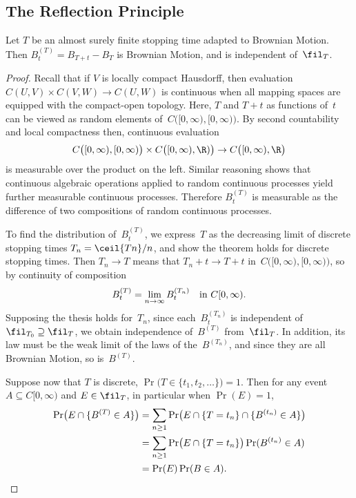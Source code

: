 \subsection	{The Reflection Principle}

\begin	{theorem}
Let $T$ be an almost surely finite stopping time adapted to Brownian Motion.
Then \( B^{(T)}_t = B_{T+t} - B_T \) is Brownian Motion,
and is independent of~$\fil_T$.
\end	{theorem}
\begin	{proof}
Recall that if $V$ is locally compact Hausdorff,
then evaluation \( C(U,V) \times C(V,W) \to C(U,W) \) is continuous
when all mapping spaces are equipped with the compact-open topology.
Here, $T$ and \( T + t \) as functions of~$t$
can be viewed as random elements of~$C\bigl([0,\infty),[0,\infty)\bigr)$.
By second countability and local compactness then,
continuous evaluation \[
	C\bigl([0,\infty),[0,\infty)\bigr) \times
		C\bigl([0,\infty),\R)\bigr)
	\to C\bigl([0,\infty),\R\bigr)
\] is measurable over the product on the left.
Similar reasoning shows that continuous algebraic operations
applied to random continuous processes
yield further measurable continuous processes.
Therefore $B^{(T)}_t$ is measurable as the difference
of two compositions of random continuous processes.

To find the distribution of~$B^{(T)}_t$,
we express~$T$ as the decreasing limit of discrete stopping times
\( T_n = \ceil{Tn}/n \),
and show the theorem holds for discrete stopping times.
Then \( T_n \to T \) means that \( T_n + t \to T + t \)
in~$C\bigl([0,\infty),[0,\infty)\bigr)$,
so by continuity of composition \[
	B^{(T)}_t = \lim_{n\to\infty} B^{(T_n)}_t
	\quad \text{in~\( C[0,\infty) \).}
\]
Supposing the thesis holds for~$T_n$,
since each~$B^{(T_n)}_t$ is independent of~\( \fil_{T_0} \supseteq \fil_T \),
we obtain independence of~$B^{(T)}$ from~$\fil_T$.
In addition, its law must be the weak limit of the laws of the~$B^{(T_n)}$,
and since they are all Brownian Motion, so is~$B^{(T)}$.

Suppose now that $T$ is discrete,
\( \Pr\bigl(T\in\{t_1,t_2,\dotsc\}\bigr) = 1 \).
Then for any event \( A \subseteq C[0,\infty) \) and \( E \in \fil_T \),
in particular when \( \Pr(E) = 1 \),
\begin	{align*}
	\Pr\bigl(E\cap\{B^{(T)}\in A\}\bigr)
	&=	\sum_{n\ge1} \Pr\bigl(
			E \cap \{T=t_n\} \cap \{B^{(t_n)}\in A\}
		\bigr) \\
	&=	\sum_{n\ge1} \Pr\bigl( E \cap \{T=t_n\} \bigr)
			\Pr(B^{(t_n)}\in A) \\
	&=	\Pr(E) \Pr( B \in A )
	\text.
	\qedhere
\end	{align*}
\end	{proof}
